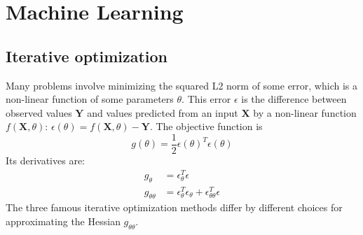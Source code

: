 \chapter{Machine Learning} \label{chap:ml}

\section{Iterative optimization} \label{sec:iterative_optim}
Many problems involve minimizing the squared L2 norm of some error, which is a non-linear function of some parameters $\theta$.
This error $\epsilon$ is the difference between observed values
$\mathbf{Y}$ and values predicted from an input $\mathbf{X}$ by a non-linear function $f(\mathbf{X}, \theta)$: $\epsilon(\theta) = f(\mathbf{X}, \theta) - \mathbf{Y}$.
The objective function is
\begin{equation}
g(\theta) = \frac{1}{2} \epsilon(\theta)^T \epsilon(\theta)
\end{equation}
Its derivatives are:
\begin{align}
g_\theta &= \epsilon_\theta^T \epsilon\\
g_{\theta\theta} &= \epsilon_\theta^T\epsilon_\theta + \epsilon_{\theta\theta}^T\epsilon
\end{align}
The three famous iterative optimization methods differ by different choices for approximating the Hessian $g_{\theta\theta}$.
